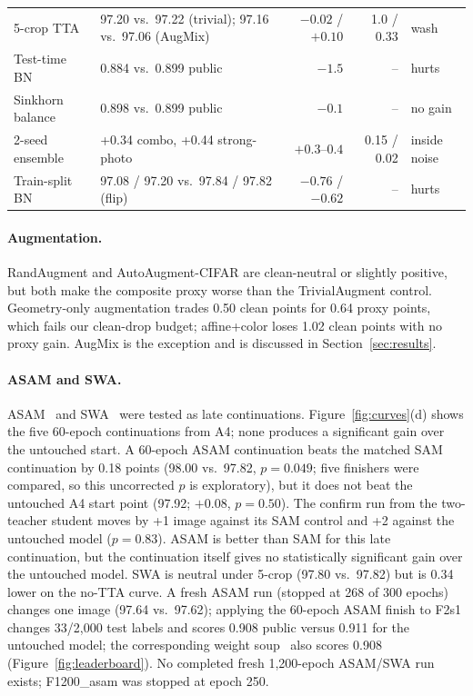 \begin{table}[t]
\begin{tabular}{@{}p{}p{}rrp{}@{}}
5-crop TTA & 97.20 vs.\ 97.22 (trivial); 97.16 vs.\ 97.06 (AugMix) & $-0.02$ / $+0.10$ & 1.0 / 0.33 & wash \\
Test-time BN & 0.884 vs.\ 0.899 public & $-1.5$ & -- & hurts \\
Sinkhorn balance & 0.898 vs.\ 0.899 public & $-0.1$ & -- & no gain \\
2-seed ensemble & +0.34 combo, +0.44 strong-photo & $+0.3$--$0.4$ & 0.15 / 0.02 & inside noise \\
Train-split BN & 97.08 / 97.20 vs.\ 97.84 / 97.82 (flip) & $-0.76$ / $-0.62$ & -- & hurts \\
\bottomrule
\end{tabular}
\end{table}

\paragraph{Augmentation.}
RandAugment and AutoAugment-CIFAR are clean-neutral or slightly positive, but both
make the composite proxy worse than the TrivialAugment control. Geometry-only
augmentation trades 0.50 clean points for 0.64 proxy points, which fails our
clean-drop budget; affine+color loses 1.02 clean points with no proxy gain.
AugMix is the exception and is discussed in Section~\ref{sec:results}.

\paragraph{ASAM and SWA.}
ASAM~\citep{kwon2021asam} and SWA~\citep{izmailov2018swa} were tested as late continuations.
Figure~\ref{fig:curves}(d) shows the five 60-epoch continuations from A4; none
produces a significant gain over the untouched start. A 60-epoch ASAM continuation beats the matched SAM
continuation by 0.18 points (98.00 vs.\ 97.82, $p=0.049$; five finishers
were compared, so this uncorrected $p$ is exploratory), but it does not beat
the untouched A4 start point (97.92; $+0.08$, $p=0.50$). The confirm run from the
two-teacher student moves by +1 image against its SAM control and +2 against the
untouched model ($p=0.83$). ASAM is better than SAM for
this late continuation, but the continuation itself gives no statistically significant gain over the untouched model.
SWA is neutral under 5-crop (97.80 vs.\ 97.82) but is 0.34 lower on the
no-TTA curve. A fresh ASAM run (stopped at 268 of 300 epochs) changes one image
(97.64 vs.\ 97.62); applying the 60-epoch ASAM finish to F2s1 changes 33/2,000
test labels and scores 0.908 public versus 0.911 for the untouched model; the
corresponding weight soup~\citep{wortsman2022soups} also scores 0.908 (Figure~\ref{fig:leaderboard}). No
completed fresh 1,200-epoch ASAM/SWA run exists; F1200\_asam was stopped at
epoch 250.

